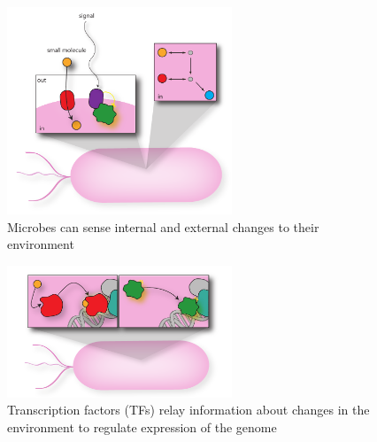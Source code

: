 \documentclass{article}
\begin{document}
\newpage
%
%
\printbibliography 

\newpage
\begin{figure}[h!]
    \centering
    \includegraphics[width=0.6\textwidth]{figures/cell_env_signal_external}
    \caption[Microbes can sense internal and external changes to their environment]{Microbes can sense internal and external changes to their environment}
    \label{fig:chap1:cellsense}
\end{figure}

\begin{figure}[h!]
    \centering
    \includegraphics[width=0.6\textwidth]{figures/cell_env_internall}
 	\caption[Transcription factors (TFs) relay information about changes in the environment to regulate expression of the genome]{Transcription factors (TFs) relay information about changes in the environment to regulate expression of the genome}
    \label{fig:chap1:cellrelay}
\end{figure}
\end{document}
